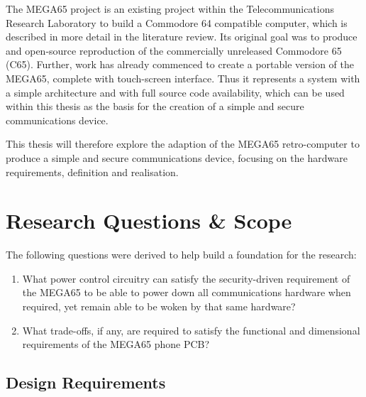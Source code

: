 The MEGA65 project is an existing project within the Telecommunications Research Laboratory to build a Commodore 64 compatible computer, which is described in more detail in the literature review.
Its original goal was to produce and open-source reproduction of the commercially unreleased Commodore 65 (C65).
Further, work has already commenced to create a portable version of the MEGA65, complete with touch-screen interface.
Thus it represents a system with a simple architecture and with full source code availability, which can be used within this thesis as the basis for the creation of a simple and secure communications device.

This thesis will therefore explore the adaption of the MEGA65 retro-computer to produce a simple and secure communications device, focusing
on the hardware requirements, definition and realisation.



\section{Research Questions \& Scope}
The following questions were derived to help build a foundation for the research:
\begin{enumerate}
\item What power control circuitry can satisfy the security-driven requirement of the MEGA65 to be able to power down all communications hardware when required, yet remain able to be woken by that same hardware?
\item What trade-offs, if any, are required to satisfy the functional and dimensional requirements of the MEGA65 phone PCB?
\end{enumerate}

\subsection{Design Requirements}

